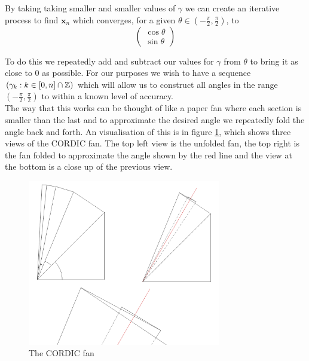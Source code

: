 {By taking taking smaller and smaller values of \(\gamma\) we can create an iterative process to find \(\mathbf{x}_n\) which converges, for a given \(\theta \in (-\frac{\pi}{2}, \frac{\pi}{2})\), to
\begin{displaymath}
	\left( \begin{array}{c}
		\cos{\theta}\\
		\sin{\theta}
	\end{array} \right)
\end{displaymath}

To do this we repeatedly add and subtract our values for \(\gamma\) from \(\theta\) to bring it as close to 0 as possible. For our purposes we wish to have a sequence \((\gamma_k : k \in [0, n] \cap \mathbb{Z})\) which will allow us to construct all angles in the range \((-\frac{\pi}{2}, \frac{\pi}{2})\) to within a known level of accuracy. \\

The way that this works can be thought of like a paper fan where each section is smaller than the last and to approximate the desired angle we repeatedly fold the angle back and forth. An visualisation of this is in figure \ref{FIG_"Fan Diagram"}, which shows three views of the CORDIC fan. The top left view is the unfolded fan, the top right is the fan folded to approximate the angle shown by the red line and the view at the bottom is a close up of the previous view.\\

\begin{figure}[!ht]
	\caption{The CORDIC fan}
	\label{FIG_"Fan Diagram"}
	\centering
	\includegraphics[width=0.75\textwidth]{"./Diagrams/Fan Diagram"}
\end{figure}

}
